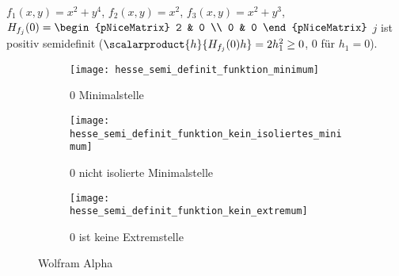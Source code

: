 \begin{beispiel*}
  \( f_1(x,y)=x^2+y^4 \), \( f_2(x,y)=x^2 \), \( f_3(x,y)=x^2+y^3 \), \( H_{f_j}(0)=\begin{pNiceMatrix} 2 & 0 \\ 0 & 0 \end{pNiceMatrix} \) \tforall \( j \) ist positiv semidefinit (\( \scalarproduct{h}{H_{f_j}(0)h}=2h_1^2\geq 0 \), \teq \(0 \) für \( h_1=0 \)).
  \begin{figure}[H]
    \centering
    \begin{subfigure}[b]{0.3\textwidth}
      \centering
      \texttt{[image: hesse\_semi\_definit\_funktion\_minimum]}
      \caption*{\( 0 \) Minimalstelle}
    \end{subfigure}
    \begin{subfigure}[b]{0.3\textwidth}
      \centering
      \texttt{[image: hesse\_semi\_definit\_funktion\_kein\_isoliertes\_minimum]}
      \caption*{\( 0 \) nicht isolierte Minimalstelle}
    \end{subfigure}
    \begin{subfigure}[b]{0.3\textwidth}
      \centering
      \texttt{[image: hesse\_semi\_definit\_funktion\_kein\_extremum]}
      \caption*{\( 0 \) ist keine Extremstelle}
    \end{subfigure}
    \caption{Wolfram Alpha}
  \end{figure}
\end{beispiel*}
